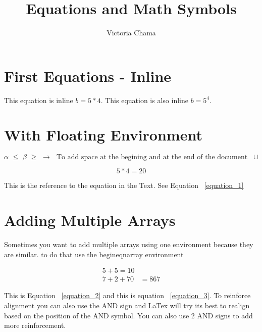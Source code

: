 \documentclass{article}
\title{Equations and Math Symbols}
\author{Victoria Chama}
\begin{document}
	\maketitle
	
	\section{First Equations - Inline}
	
	This equation is inline $b = 5*4$.
	This equation is also inline $b = 5^4$.
	
	\section{With Floating Environment}
	

	\begin{equation}
	\label{equation_1}
	\alpha \,\, \leq  \,\, \beta \,\, \geq \,\, \rightarrow \,\, \text{ To add space at the begining and at the end of the document } \,\, \cup 
	\end{equation}
	
	
	\begin{equation*}
	5*4 = 20
	\end{equation*}
	
	This is the reference to the equation in the Text. See Equation ~\ref{equation_1}
	
	\section{Adding Multiple Arrays}
	Sometimes you want to add multiple arrays using one environment because they are similar. to do that use the begin{eqnarray} environment
	 
	\begin{eqnarray}
	\label{equation_2}
	5 + 5= 10 \\ 
	\label{equation_3}
	7 + 2 + 70 &= 867
	\end{eqnarray}
	
	This is Equation ~\ref{equation_2} and this is equation ~\ref{equation_3}. To reinforce alignment you can also use the AND sign and LaTex will try its best to realign based on the position of the AND symbol. You can also use 2 AND signs to add more reinforcement. 
	
\end{document}
